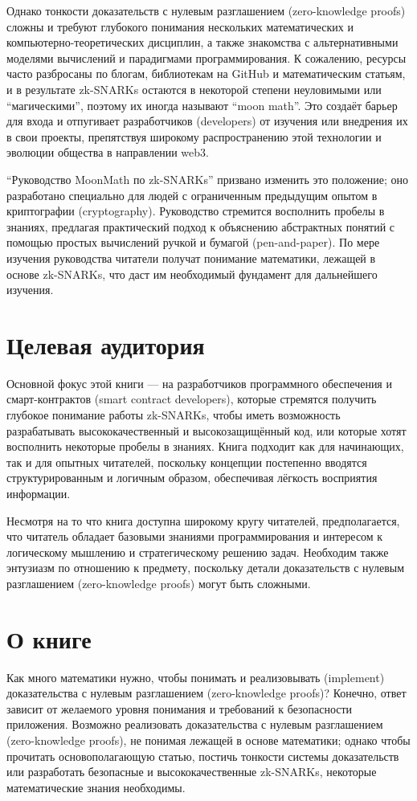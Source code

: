 Однако тонкости доказательств с нулевым разглашением (zero-knowledge proofs) сложны и требуют глубокого понимания нескольких математических и компьютерно-теоретических дисциплин, а также знакомства с альтернативными моделями вычислений и парадигмами программирования. К сожалению, ресурсы часто разбросаны по блогам, библиотекам на GitHub и математическим статьям, и в результате zk-SNARKs остаются в некоторой степени неуловимыми или ``магическими'', поэтому их иногда называют ``moon math''. Это создаёт барьер для входа и отпугивает разработчиков (developers) от изучения или внедрения их в свои проекты, препятствуя широкому распространению этой технологии и эволюции общества в направлении web3.

``Руководство MoonMath по zk-SNARKs'' призвано изменить это положение; оно разработано специально для людей с ограниченным предыдущим опытом в криптографии (cryptography). Руководство стремится восполнить пробелы в знаниях, предлагая практический подход к объяснению абстрактных понятий с помощью простых вычислений ручкой и бумагой (pen-and-paper). По мере изучения руководства читатели получат понимание математики, лежащей в основе zk-SNARKs, что даст им необходимый фундамент для дальнейшего изучения.

\section{Целевая аудитория}
Основной фокус этой книги — на разработчиков программного обеспечения и смарт-контрактов (smart contract developers), которые стремятся получить глубокое понимание работы zk-SNARKs, чтобы иметь возможность разрабатывать высококачественный и высокозащищённый код, или которые хотят восполнить некоторые пробелы в знаниях. Книга подходит как для начинающих, так и для опытных читателей, поскольку концепции постепенно вводятся структурированным и логичным образом, обеспечивая лёгкость восприятия информации.

Несмотря на то что книга доступна широкому кругу читателей, предполагается, что читатель обладает базовыми знаниями программирования и интересом к логическому мышлению и стратегическому решению задач. Необходим также энтузиазм по отношению к предмету, поскольку детали доказательств с нулевым разглашением (zero-knowledge proofs) могут быть сложными. 


\section{О книге}
Как много математики нужно, чтобы понимать и реализовывать (implement) доказательства с нулевым разглашением (zero-knowledge proofs)? Конечно, ответ зависит от желаемого уровня понимания и требований к безопасности приложения. Возможно реализовать доказательства с нулевым разглашением (zero-knowledge proofs), не понимая лежащей в основе математики; однако чтобы прочитать основополагающую статью, постичь тонкости системы доказательств или разработать безопасные и высококачественные zk-SNARKs, некоторые математические знания необходимы.

